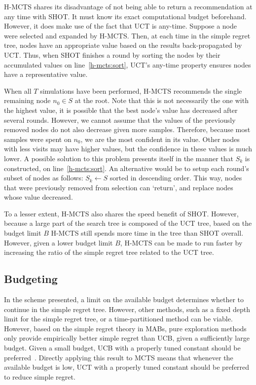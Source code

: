\documentclass{kecsmstr}
\begin{document}
H-MCTS shares its disadvantage of not being able to return a recommendation at any time with SHOT. It must know its exact computational budget beforehand. However, it does make use of the fact that UCT is any-time. Suppose a node were selected and expanded by H-MCTS. Then, at each time in the simple regret tree, nodes have an appropriate value based on the results back-propagated by UCT. Thus, when SHOT finishes a round by sorting the nodes by their accumulated values on line~\ref{h-mcts:sort}, UCT's any-time property ensures nodes have a representative value.

When all $T$ simulations have been performed, H-MCTS recommends the single remaining node $n_0 \in S$ at the root. Note that this is not necessarily the one with the highest value, it is possible that the best node's value has decreased after several rounds. However, we cannot assume that the values of the previously removed nodes do not also decrease given more samples. Therefore, because most samples were spent on $n_0$, we are the most confident in its value. Other nodes with less visits may have higher values, but the confidence in these values is much lower. A possible solution to this problem presents itself in the manner that $S_k$ is constructed, on line~\ref{h-mcts:sort}. An alternative would be to setup each round's subset of nodes as follows: $S_k \gets S$ sorted in descending order. This way, nodes that were previously removed from selection can `return', and replace nodes whose value decreased.

To a lesser extent, H-MCTS also shares the speed benefit of SHOT. However, because a large part of the search tree is composed of the UCT tree, based on the budget limit $B$ H-MCTS still spends more time in the tree than SHOT overall. However, given a lower budget limit $B$, H-MCTS can be made to run faster by increasing the ratio of the simple regret tree related to the UCT tree.

\subsection{Budgeting}
In the scheme presented, a limit on the available budget determines whether to continue in the simple regret tree. However, other methods, such as a fixed depth limit for the simple regret tree, or a time-partitioned method can be viable. However, based on the simple regret theory in MABs, pure exploration methods only provide empirically better simple regret than UCB, given a sufficiently large budget. Given a small budget, UCB with a properly tuned constant should be preferred~. Directly applying this result to MCTS means that whenever the available budget is low, UCT with a properly tuned constant should be preferred to reduce simple regret.
\end{document}
